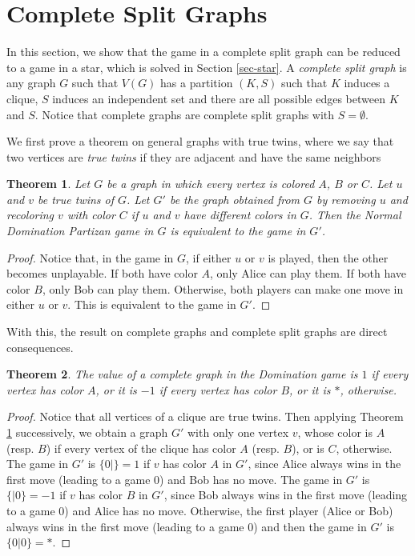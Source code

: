 \documentclass[a4paper,11pt]{article}
\newtheorem{theorem}{Theorem}
\begin{document}
\section{Complete Split Graphs}\label{sec-split}

In this section, we show that the game in a complete split graph can be reduced to a game in a star, which is solved in Section \ref{sec-star}.
A \emph{complete split graph} is any graph $G$ such that $V(G)$ has a partition $(K,S)$ such that $K$ induces a clique, $S$ induces an independent set and there are all possible edges between $K$ and $S$.
Notice that complete graphs are complete split graphs with $S=\emptyset$.

We first prove a theorem on general graphs with true twins, where we say that two vertices are \emph{true twins} if they are adjacent and have the same neighbors

\begin{theorem}\label{thm-twins}
Let $G$ be a graph in which every vertex is colored $A$, $B$ or $C$. Let $u$ and $v$ be true twins of $G$.
Let $G'$ be the graph obtained from $G$ by removing $u$ and recoloring $v$ with color $C$ if $u$ and $v$ have different colors in $G$. Then the Normal Domination Partizan game in $G$ is equivalent to the game in $G'$.
\end{theorem}

\begin{proof}
Notice that, in the game in $G$, if either $u$ or $v$ is played, then the other becomes unplayable. If both have color $A$, only Alice can play them. If both have color $B$, only Bob can play them. Otherwise, both players can make one move in either $u$ or $v$. This is equivalent to the game in $G'$.
\end{proof}

With this, the result on complete graphs and complete split graphs are direct consequences.

\begin{theorem}\label{thm-clique}
The value of a complete graph in the Domination game is $1$ if every vertex has color $A$, or it is $-1$ if every vertex has color $B$, or it is $*$, otherwise.
\end{theorem}

\begin{proof}
Notice that all vertices of a clique are true twins. Then applying Theorem \ref{thm-twins} successively, we obtain a graph $G'$ with only one vertex $v$, whose color is $A$ (resp. $B$) if every vertex of the clique has color $A$ (resp. $B$), or is $C$, otherwise.
The game in $G'$ is $\{0|\}=1$ if $v$ has color $A$ in $G'$, since Alice always wins in the first move (leading to a game $0$) and Bob has no move.
The game in $G'$ is $\{|0\}=-1$ if $v$ has color $B$ in $G'$, since Bob always wins in the first move (leading to a game $0$) and Alice has no move.
Otherwise, the first player (Alice or Bob) always wins in the first move (leading to a game $0$) and then the game in $G'$ is $\{0|0\}=*$.
\end{proof}
\end{document}
